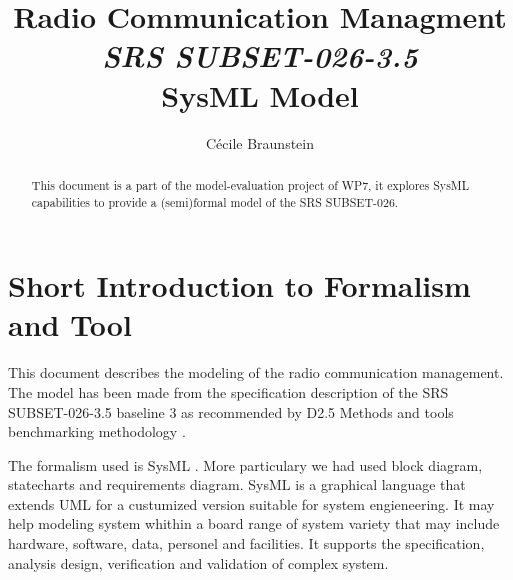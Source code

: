 \documentclass{template/openetcs_article}
\begin{document}
\frontmatter
{}





\author{C\'ecile Braunstein}


\title{Radio Communication Managment \\
{\it SRS SUBSET-026-3.5} \\SysML Model}




\begin{abstract}
This document is a part of the model-evaluation project of WP7, it explores
SysML capabilities to provide a (semi)formal model of the SRS SUBSET-026.
\end{abstract}
\maketitle
\tableofcontents
\listoffiguresandtables
\newpage

\section{Short Introduction to Formalism and Tool}
\label{sec:short-intr-form}
This document describes the modeling  of the radio communication management. The
model has been made from the specification description of the SRS SUBSET-026-3.5
 baseline 3 as recommended by D2.5 Methods and tools benchmarking methodology
 \cite{D2-5}.


The formalism used  is SysML \cite{SysML}. More particulary we had used
block diagram, statecharts and requirements diagram. 
SysML is a graphical language that extends UML for a custumized version suitable
for system engieneering. It may help modeling system whithin a board range of
system variety that may include hardware, software, data, personel and
facilities. It supports the specification, analysis design, verification and
validation of complex system. 
\end{document}
